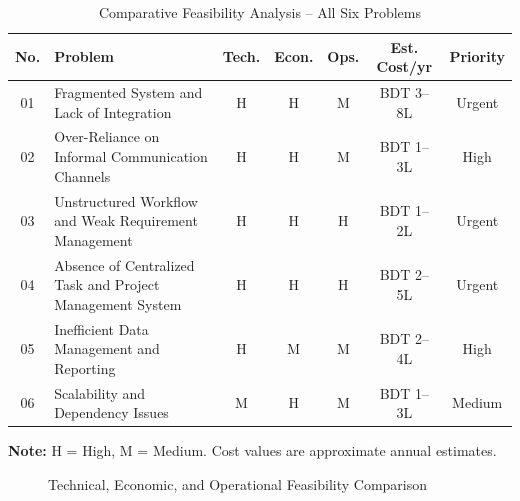 \documentclass[12pt,a4paper]{report}
\begin{document}
\begin{table}[H]
\centering
\caption{Comparative Feasibility Analysis -- All Six Problems}
\renewcommand{\arraystretch}{1.3}
\small
\begin{tabularx}{\textwidth}{|c|X|c|c|c|c|c|}
\hline
\rowcolor{secondary}
\textbf{No.} & \textbf{Problem} & \textbf{Tech.} & \textbf{Econ.} & \textbf{Ops.} & \textbf{Est. Cost/yr} & \textbf{Priority} \\
\hline
01 & Fragmented System and Lack of Integration & H & H & M & BDT 3--8L & Urgent \\
\hline
02 & Over-Reliance on Informal Communication Channels & H & H & M & BDT 1--3L & High \\
\hline
03 & Unstructured Workflow and Weak Requirement Management & H & H & H & BDT 1--2L & Urgent \\
\hline
04 & Absence of Centralized Task and Project Management System & H & H & H & BDT 2--5L & Urgent \\
\hline
05 & Inefficient Data Management and Reporting & H & M & M & BDT 2--4L & High \\
\hline
06 & Scalability and Dependency Issues & M & H & M & BDT 1--3L & Medium \\
\hline
\end{tabularx}

\vspace{0.2cm}
\small{\textbf{Note:} H = High, M = Medium. Cost values are approximate annual estimates.}
\end{table}

\begin{figure}[H]
\centering
{}
\caption{Technical, Economic, and Operational Feasibility Comparison}
\end{figure}
\end{document}
